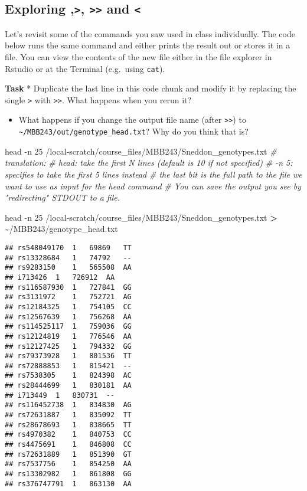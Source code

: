 \documentclass[
]{article}
\newenvironment{Shaded}{\begin{snugshade}}{\end{snugshade}}
\newcommand{\AttributeTok}[1]{\textcolor[rgb]{0.77,0.63,0.00}{#1}}
\newcommand{\CommentTok}[1]{\textcolor[rgb]{0.56,0.35,0.01}{\textit{#1}}}
\newcommand{\FunctionTok}[1]{\textcolor[rgb]{0.00,0.00,0.00}{#1}}
\newcommand{\NormalTok}[1]{#1}
\newcommand{\OperatorTok}[1]{\textcolor[rgb]{0.81,0.36,0.00}{\textbf{#1}}}
\providecommand{\tightlist}{%
  \setlength{\itemsep}{0pt}\setlength{\parskip}{0pt}}
\begin{document}
\hypertarget{exploring-and}{%
\subsection{\texorpdfstring{Exploring
\texttt{\textbar{}},\texttt{\textgreater{}},
\texttt{\textgreater{}\textgreater{}} and
\texttt{\textless{}}}{Exploring \textbar,\textgreater, \textgreater\textgreater{} and \textless{}}}\label{exploring-and}}

Let's revisit some of the commands you saw used in class individually.
The code below runs the same command and either prints the result out or
stores it in a file. You can view the contents of the new file either in
the file explorer in Rstudio or at the Terminal (e.g.~using
\texttt{cat}).

\textbf{Task} * Duplicate the last line in this code chunk and modify it
by replacing the single \texttt{\textgreater{}} with
\texttt{\textgreater{}\textgreater{}}. What happens when you rerun it?

\begin{itemize}
\tightlist
\item
  What happens if you change the output file name (after
  \texttt{\textgreater{}\textgreater{}}) to
  \texttt{\textasciitilde{}/MBB243/out/genotype\_head.txt}? Why do you
  think that is?
\end{itemize}

\begin{Shaded}
\begin{Highlighting}[]
\FunctionTok{head} \AttributeTok{{-}n}\NormalTok{ 25 /local{-}scratch/course\_files/MBB243/Sneddon\_genotypes.txt}
\CommentTok{\# translation:}
\CommentTok{\# head: take the first N lines (default is 10 if not specified)}
\CommentTok{\# {-}n 5: specifies to take the first 5 lines instead}
\CommentTok{\# the last bit is the full path to the file we want to use as input for the head command}
\CommentTok{\# You can save the output you see by "redirecting" STDOUT to a file. }

\FunctionTok{head} \AttributeTok{{-}n}\NormalTok{ 25 /local{-}scratch/course\_files/MBB243/Sneddon\_genotypes.txt }\OperatorTok{\textgreater{}}\NormalTok{ \textasciitilde{}/MBB243/genotype\_head.txt}
\end{Highlighting}
\end{Shaded}

\begin{verbatim}
## rs548049170  1   69869   TT
## rs13328684   1   74792   --
## rs9283150    1   565508  AA
## i713426  1   726912  AA
## rs116587930  1   727841  GG
## rs3131972    1   752721  AG
## rs12184325   1   754105  CC
## rs12567639   1   756268  AA
## rs114525117  1   759036  GG
## rs12124819   1   776546  AA
## rs12127425   1   794332  GG
## rs79373928   1   801536  TT
## rs72888853   1   815421  --
## rs7538305    1   824398  AC
## rs28444699   1   830181  AA
## i713449  1   830731  --
## rs116452738  1   834830  AG
## rs72631887   1   835092  TT
## rs28678693   1   838665  TT
## rs4970382    1   840753  CC
## rs4475691    1   846808  CC
## rs72631889   1   851390  GT
## rs7537756    1   854250  AA
## rs13302982   1   861808  GG
## rs376747791  1   863130  AA
\end{verbatim}
\end{document}
